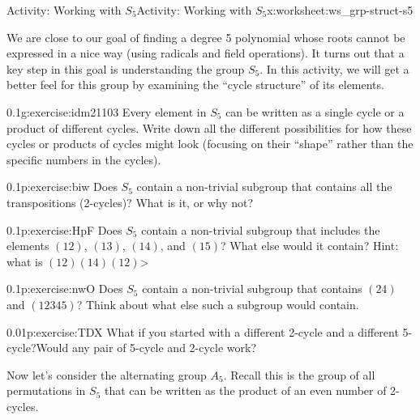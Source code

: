 \documentclass[11pt]{book}
\begin{document}
%
%
\typeout{************************************************}
\typeout{************************************************}
%
\begin{worksheet-subsection}{Activity: Working with \(S_5\)}{}{Activity: Working with \(S_5\)}{}{}{x:worksheet:ws_grp-struct-s5}
\begin{introduction}{}%
We are close to our goal of finding a degree 5 polynomial whose roots cannot be expressed in a nice way (using radicals and field operations).  It turns out that a key step in this goal is understanding the group \(S_5\).  In this activity, we will get a better feel for this group by examining the ``cycle structure'' of its elements.%
\end{introduction}%
\begin{divisionexercise}{1}{}{0.1}{g:exercise:idm21103}%
Every element in \(S_5\) can be written as a single cycle or a product of different cycles.  Write down all the different possibilities for how these cycles or products of cycles might look (focusing on their ``shape'' rather than the specific numbers in the cycles).%
\end{divisionexercise}%
\begin{divisionexercise}{2}{}{0.1}{p:exercise:biw}%
Does \(S_5\) contain a non-trivial subgroup that contains all the transpositions (2-cycles)?  What is it, or why not?%
\end{divisionexercise}%
\begin{divisionexercise}{3}{}{0.1}{p:exercise:HpF}%
Does \(S_5\) contain a non-trivial subgroup that includes the elements \((12)\), \((13)\), \((14)\), and \((15)\)?  What else would it contain?  Hint: what is \((12)(14)(12)\)\textgreater{}%
\end{divisionexercise}%
\begin{divisionexercise}{4}{}{0.1}{p:exercise:nwO}%
Does \(S_5\) contain a non-trivial subgroup that contains \((24) \) and \((12345)\)?  Think about what else such a subgroup would contain.%
\end{divisionexercise}%
\begin{divisionexercise}{5}{}{0.01}{p:exercise:TDX}%
What if you started with a different 2-cycle and a different 5-cycle?Would any pair of 5-cycle and 2-cycle work?%
\end{divisionexercise}%
\clearpage
Now let's consider the alternating group \(A_5\).  Recall this is the group of all permutations in \(S_5\) that can be written as the product of an even number of 2-cycles.%

\end{worksheet-subsection}
\end{document}
